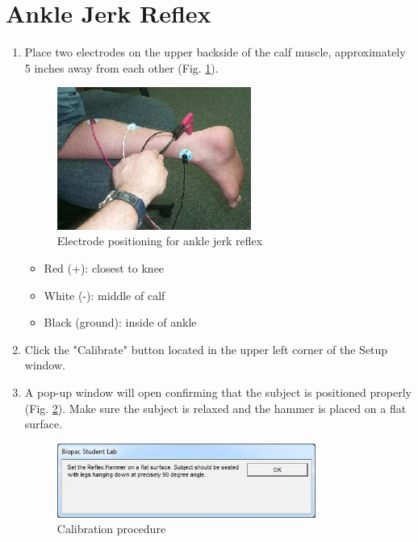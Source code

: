 \documentclass{article}
\begin{document}
\section*{Ankle Jerk Reflex}
\begin{enumerate}
	\item Place two electrodes on the upper backside of the calf muscle, approximately 5 inches away from each other (Fig. \ref{ankle}).
		\begin{figure}[h]
		\centering
		\includegraphics[width=0.6\textwidth]{../images/EMG_II_4.jpg}	
		\caption{Electrode positioning for ankle jerk reflex}
		\label{ankle}
		\end{figure}
	
		\begin{itemize}
			\item Red (+): closest to knee
			\item White (-): middle of calf
			\item Black (ground): inside of ankle
		\end{itemize}
	
	\item Click the "Calibrate" button located in the upper left corner of the Setup window.
	\item A pop-up window will open confirming that the subject is positioned properly (Fig. \ref{calibration}). Make sure the subject is relaxed and the hammer is placed on a flat surface.
		\begin{figure}[h]
		\centering
		\includegraphics[width=0.8\textwidth]{../images/EMG_II_5.jpg}	
		\caption{Calibration procedure}
		\label{calibration}
		\end{figure}
		

\end{enumerate}
\end{document}
